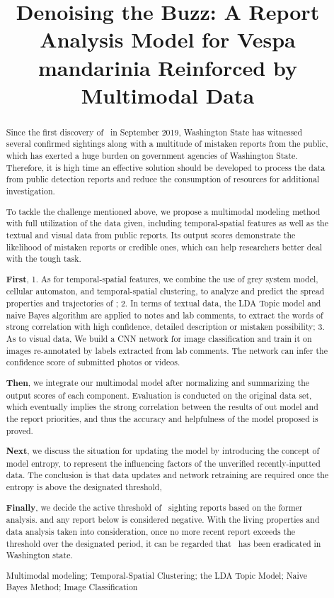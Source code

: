 \documentclass{mcmthesis}
\title{Denoising the Buzz: A Report Analysis Model for Vespa mandarinia Reinforced by Multimodal Data}
\begin{document}
\begin{abstract}

Since the first discovery of \VM \ in September 2019, Washington State has witnessed several confirmed sightings along with a multitude of mistaken reports from the public, which has exerted a huge burden on government agencies of Washington State. Therefore, it is high time an effective solution should be developed to process the data from public detection reports and reduce the consumption of resources for additional investigation.

To tackle the challenge mentioned above, we propose a multimodal modeling method with full utilization of the data given, including temporal-spatial features as well as the textual and visual data from public reports. Its output scores demonstrate the likelihood of mistaken reports or credible ones, which can help researchers better deal with the tough task.

\textbf{First}, 1. As for temporal-spatial features, we combine the use of grey system model, cellular automaton, and temporal-spatial clustering, to analyze and predict the spread properties and trajectories of \VM; 2. In terms of textual data, the LDA Topic model and naive Bayes algorithm are applied to notes and lab comments, to extract the words of strong correlation with high confidence, detailed description or mistaken possibility; 3. As to visual data, We build a CNN network for image classification and train it on images re-annotated by labels extracted from lab comments. The network can infer the confidence score of submitted photos or videos.

\textbf{Then}, we integrate our multimodal model after normalizing and summarizing the output scores of each component. Evaluation is conducted on the original data set, which eventually implies the strong correlation between the results of out model and the report priorities, and thus the accuracy and helpfulness of the model proposed is proved.

\textbf{Next}, we discuss the situation for updating the model by introducing the concept of model entropy, to represent the influencing factors of the unverified recently-inputted data. The conclusion is that data updates and network retraining are required once the entropy is above the designated threshold, 

\textbf{Finally}, we decide the active threshold of \VM \ sighting reports based on the former analysis. and any report below is considered negative. With the living properties and data analysis taken into consideration, once no more recent report exceeds the threshold over the designated period, it can be regarded that \VM \ has been eradicated in Washington state.


\begin{keywords}
Multimodal modeling; Temporal-Spatial Clustering; the LDA Topic Model; Naive Bayes Method; Image Classification
\end{keywords}
\end{abstract}
\end{document}
